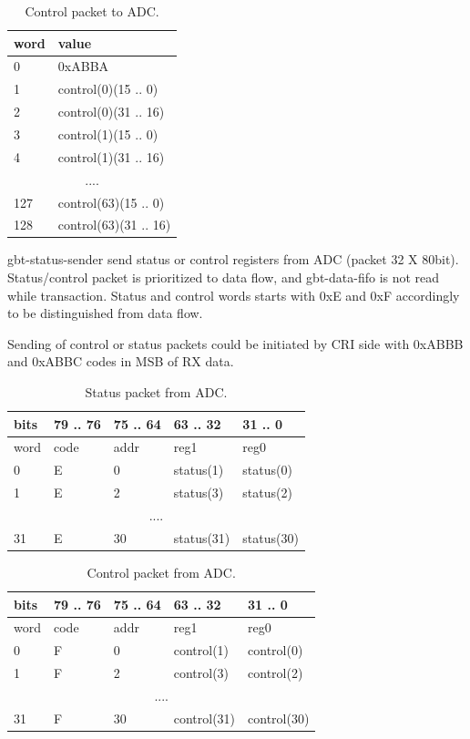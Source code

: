 \documentclass{article}
\begin{document}
\begin{table}[H]
\centering
\begin{tabular}{| l | l |}
\hline
word & value \\ \hline
0 & 0xABBA \\ \hline
1 & control(0)(15 .. 0) \\ \hline
2 & control(0)(31 .. 16) \\ \hline
3 & control(1)(15 .. 0) \\ \hline
4 & control(1)(31 .. 16) \\ \hline
\multicolumn{2}{|c|}{....} \\ \hline
127 & control(63)(15 .. 0) \\ \hline
128 & control(63)(31 .. 16) \\ \hline
\end{tabular}
\caption{Control packet to ADC.\label{tab4}}
\end{table}

gbt-status-sender send status or control registers from ADC (packet 32 X 80bit).  Status/control packet is prioritized to data flow, and gbt-data-fifo is not read while transaction. Status and control words starts with 0xE and 0xF accordingly to be distinguished from data flow. 

Sending of control or status packets could be initiated by CRI side with 0xABBB and 0xABBC codes in MSB of RX data.

\begin{table}[H]
\centering
\begin{tabular}{| l | l | l | l | l |}
\hline
 bits & 79 .. 76 & 75 .. 64 & 63 .. 32 & 31 .. 0 \\ \hline
word & code & addr & reg1 & reg0 \\ \hline
0 & E & 0 & status(1) & status(0) \\ \hline
1 & E & 2 & status(3) & status(2) \\ \hline
\multicolumn{5}{|c|}{....} \\ \hline
31 & E & 30 & status(31) & status(30) \\ \hline
\end{tabular}
\caption{Status packet from ADC.\label{tab4}}
\end{table}

\begin{table}[H]
\centering
\begin{tabular}{| l | l | l | l | l |}
\hline
 bits & 79 .. 76 & 75 .. 64 & 63 .. 32 & 31 .. 0 \\ \hline
word & code & addr & reg1 & reg0 \\ \hline
0 & F & 0 & control(1) & control(0) \\ \hline
1 & F & 2 & control(3) & control(2) \\ \hline
\multicolumn{5}{|c|}{....} \\ \hline
31 & F & 30 & control(31) & control(30) \\ \hline
\end{tabular}
\caption{Control packet from ADC.\label{tab4}}
\end{table}
\end{document}

